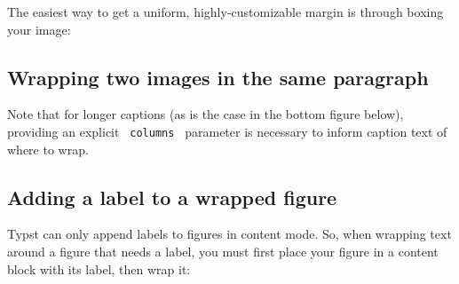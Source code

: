 The easiest way to get a uniform, highly-customizable margin is through
boxing your image:

\begin{Shaded}
\begin{Highlighting}[]
\NormalTok{\#wrap{-}content(boxed)[}
\NormalTok{]}
\end{Highlighting}
\end{Shaded}


\subsection{Wrapping two images in the same
paragraph}\label{wrapping-two-images-in-the-same-paragraph}

Note that for longer captions (as is the case in the bottom figure
below), providing an explicit \texttt{\ columns\ } parameter is
necessary to inform caption text of where to wrap.

\begin{Shaded}
\begin{Highlighting}[]
\NormalTok{)}
\NormalTok{)}
\end{Highlighting}
\end{Shaded}


\subsection{Adding a label to a wrapped
figure}\label{adding-a-label-to-a-wrapped-figure}

Typst can only append labels to figures in content mode. So, when
wrapping text around a figure that needs a label, you must first place
your figure in a content block with its label, then wrap it:

\begin{Shaded}
\begin{Highlighting}[]
\NormalTok{\#let fig = [}
\NormalTok{]}
\end{Highlighting}
\end{Shaded}

